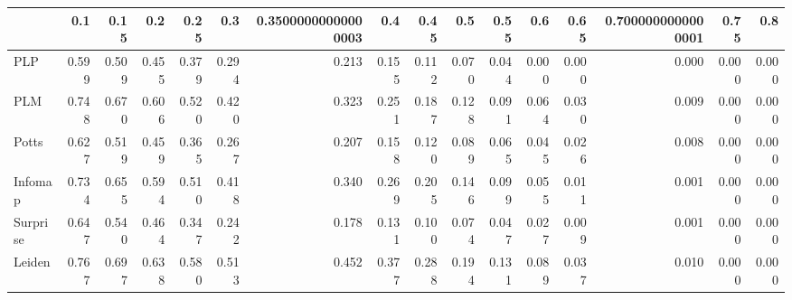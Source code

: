 \begin{tabular}{lrrrrrrrrrrrrrrr}
\toprule
{} &   0.1 &  0.15 &   0.2 &  0.25 &   0.3 & 0.35000000000000003 &   0.4 &  0.45 &   0.5 &  0.55 &   0.6 &  0.65 & 0.7000000000000001 &  0.75 &   0.8 \\
\midrule
PLP      & 0.599 & 0.509 & 0.455 & 0.379 & 0.294 &               0.213 & 0.155 & 0.112 & 0.070 & 0.044 & 0.000 & 0.000 &              0.000 & 0.000 & 0.000 \\
PLM      & 0.748 & 0.670 & 0.606 & 0.520 & 0.420 &               0.323 & 0.251 & 0.187 & 0.128 & 0.091 & 0.064 & 0.030 &              0.009 & 0.000 & 0.000 \\
Potts    & 0.627 & 0.519 & 0.459 & 0.365 & 0.267 &               0.207 & 0.158 & 0.120 & 0.089 & 0.065 & 0.045 & 0.026 &              0.008 & 0.000 & 0.000 \\
Infomap  & 0.734 & 0.655 & 0.594 & 0.510 & 0.418 &               0.340 & 0.269 & 0.205 & 0.146 & 0.099 & 0.055 & 0.011 &              0.001 & 0.000 & 0.000 \\
Surprise & 0.647 & 0.540 & 0.464 & 0.347 & 0.242 &               0.178 & 0.131 & 0.100 & 0.074 & 0.047 & 0.027 & 0.009 &              0.001 & 0.000 & 0.000 \\
Leiden   & 0.767 & 0.697 & 0.638 & 0.580 & 0.513 &               0.452 & 0.377 & 0.288 & 0.194 & 0.131 & 0.089 & 0.037 &              0.010 & 0.000 & 0.000 \\
\bottomrule
\end{tabular}
